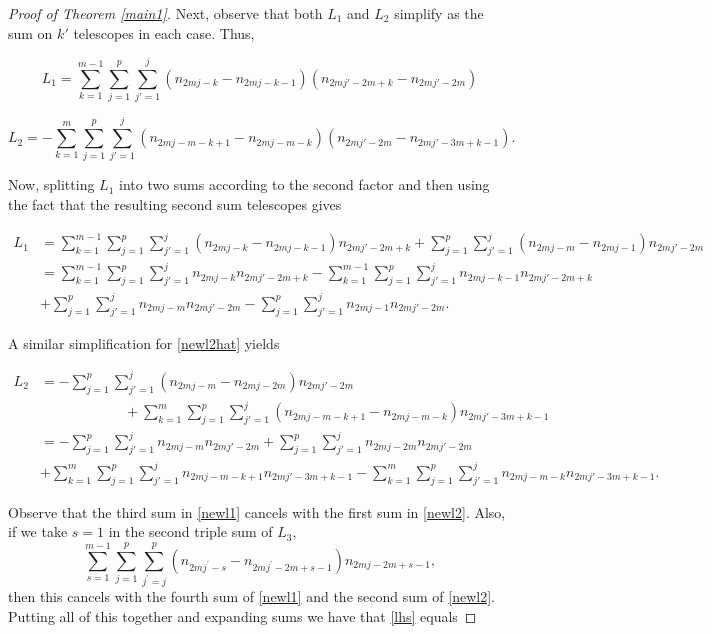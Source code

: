 \documentclass[11pt,reqno]{amsart}
\theoremstyle{definition}
\numberwithin{equation}{section}
\begin{document}
\begin{proof}[Proof of Theorem \ref{main1}]
\noindent Next, observe that both $L_1$ and $L_2$ simplify as the sum on $k'$ telescopes in each case. Thus,

\begin{equation} \label{newl1hat}
L_1 = \sum_{k=1}^{m-1} \sum_{j=1}^{p} \sum_{j'=1}^{j} (n_{2mj-k} - n_{2mj-k-1})(n_{2mj' - 2m + k} - n_{2mj' - 2m})
\end{equation}

\begin{equation} \label{newl2hat}
L_2 = - \sum_{k=1}^{m} \sum_{j=1}^{p} \sum_{j'=1}^{j} (n_{2mj - m - k +1} - n_{2mj - m- k})(n_{2mj'-2m} - n_{2mj' - 3m + k-1}).
\end{equation}

\noindent Now, splitting $L_1$ into two sums according to the second factor and then using the fact that the resulting second sum telescopes gives

\begin{align} 
L_1 &= \sum_{k=1}^{m-1} \sum_{j=1}^{p} \sum_{j'=1}^{j} (n_{2mj - k} - n_{2mj-k-1}) n_{2mj'-2m+k} + \sum_{j=1}^{p} \sum_{j'=1}^{j} (n_{2mj-m} - n_{2mj-1}) n_{2mj'-2m} \nonumber \\
&= \sum_{k=1}^{m-1} \sum_{j=1}^{p} \sum_{j'=1}^{j} n_{2mj - k}  n_{2mj'-2m+k} - \sum_{k=1}^{m-1} \sum_{j=1}^{p} \sum_{j'=1}^{j} n_{2mj-k-1} n_{2mj'-2m+k}  \nonumber \\
& + \sum_{j=1}^{p} \sum_{j'=1}^{j} n_{2mj-m}n_{2mj'-2m} - \sum_{j=1}^{p} \sum_{j'=1}^{j} n_{2mj-1} n_{2mj'-2m}. \label{newl1}
\end{align}

\noindent A similar simplification for \eqref{newl2hat} yields

\begin{align} 
L_2 &= - \sum_{j=1}^{p} \sum_{j'=1}^{j} (n_{2mj-m} - n_{2mj-2m})  n_{2mj'-2m}  \nonumber \\
&\qquad \qquad \qquad + \sum_{k=1}^{m} \sum_{j=1}^{p} \sum_{j'=1}^{j} (n_{2mj-m-k+1} - n_{2mj-m-k}) n_{2mj'-3m+k-1} \nonumber \\
&=  - \sum_{j=1}^{p} \sum_{j'=1}^{j} n_{2mj-m}n_{2mj'-2m} + \sum_{j=1}^{p} \sum_{j'=1}^{j}n_{2mj-2m}  n_{2mj'-2m} \nonumber \\
& + \sum_{k=1}^{m} \sum_{j=1}^{p} \sum_{j'=1}^{j} n_{2mj-m-k+1}n_{2mj'-3m+k-1} - \sum_{k=1}^{m} \sum_{j=1}^{p} \sum_{j'=1}^{j} n_{2mj-m-k} n_{2mj'-3m+k-1}. 
\label{newl2}
\end{align}

\noindent Observe that the third sum in \eqref{newl1} cancels with the first sum in \eqref{newl2}. Also, if we take $s=1$ in the second triple sum of $L_3$, 
\begin{equation*}
\sum_{s=1}^{m-1} \sum_{j=1}^{p}  \sum_{j^{\prime}=j}^{p} (n_{2mj^{\prime} - s} - n_{2mj^{\prime} - 2m + s-1} ) n_{2mj - 2m + s-1}, 
\end{equation*}
then this cancels with the fourth sum of \eqref{newl1} and the second sum of \eqref{newl2}.  Putting all of this together and expanding sums we have that \eqref{lhs} equals


\end{proof}
\end{document}
